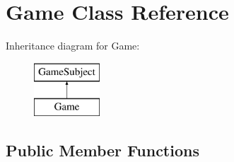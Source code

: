 \hypertarget{classGame}{
\section{Game Class Reference}
\label{classGame}
}
Inheritance diagram for Game:\begin{figure}[H]
\begin{center}
\leavevmode
\includegraphics[height=2cm]{classGame}
\end{center}
\end{figure}
\subsection*{Public Member Functions}
